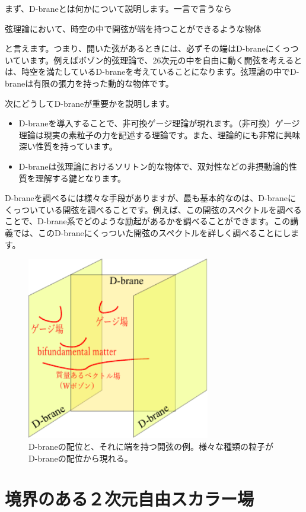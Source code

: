\documentclass[report,paper=a4, fontsize=12pt, line_length=16cm, number_of_lines=33,dvipdfmx]{jlreq}
\newenvironment{important}{\begin{tcolorbox}[
  colback = white,
  colframe = red!35,
  boxrule = 2mm,
  fonttitle = \bfseries,
  after = \noindent] }{\end{tcolorbox}}
\numberwithin{equation}{chapter}
\numberwithin{equation}{section}
\begin{document}
まず、D-braneとは何かについて説明します。一言で言うなら
\begin{important}
  弦理論において、時空の中で開弦が端を持つことができるような物体
\end{important}
と言えます。つまり、開いた弦があるときには、必ずその端はD-braneにくっついています。例えばボゾン的弦理論で、26次元の中を自由に動く開弦を考えるとは、時空を満たしているD-braneを考えていることになります。弦理論の中でD-braneは有限の張力を持った動的な物体です。

次にどうしてD-braneが重要かを説明します。
\begin{itemize}
  \item D-braneを導入することで、非可換ゲージ理論が現れます。（非可換）ゲージ理論は現実の素粒子の力を記述する理論です。また、理論的にも非常に興味深い性質を持っています。
  \item D-braneは弦理論におけるソリトン的な物体で、双対性などの非摂動論的性質を理解する鍵となります。
\end{itemize}

D-braneを調べるには様々な手段がありますが、最も基本的なのは、D-braneにくっついている開弦を調べることです。例えば、この開弦のスペクトルを調べることで、D-brane系でどのような励起があるかを調べることができます。この講義では、このD-braneにくっついた開弦のスペクトルを詳しく調べることにします。

\begin{figure}
  \centering
  \includegraphics[width=8cm]{generalbrane.pdf}
  \caption{D-braneの配位と、それに端を持つ開弦の例。様々な種類の粒子がD-braneの配位から現れる。}
\end{figure}


\section{境界のある２次元自由スカラー場}
\end{document}
